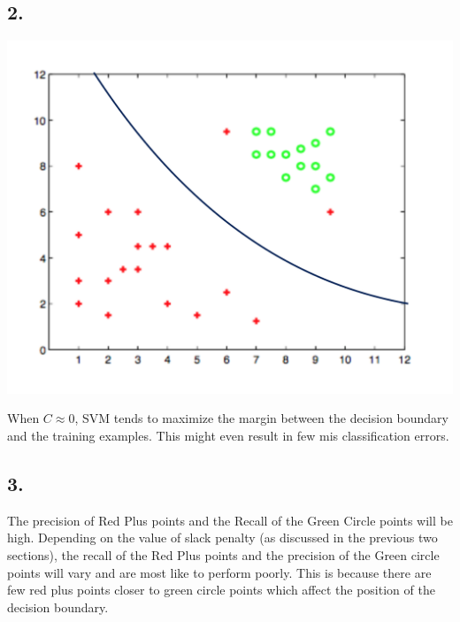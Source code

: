 \documentclass[letterpaper,doc,notimes]{apa6}
\begin{document}
\subsection{2. }
\begin{minipage}{0.5\textwidth} \includegraphics[scale=0.3]{5b} \end{minipage}
\begin{minipage}{0.5\textwidth}\raggedleft
	When $C \approx 0$, SVM tends to maximize the margin between the decision boundary and the training examples. This might even result in few mis classification errors.
 \end{minipage}
\subsection{3. }
The precision of Red Plus points and the Recall of the Green Circle points will be high.
Depending on the value of slack penalty (as discussed in the previous two sections), the recall of the Red Plus points and the precision of the Green circle points will vary and are most like to perform poorly. This is because there are few red plus points closer to green circle points which affect the position of the decision boundary.
\end{document}
